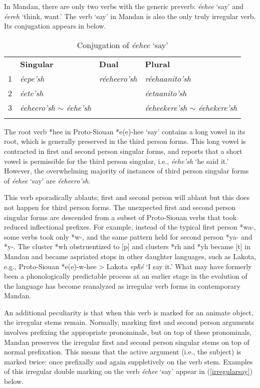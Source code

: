 In Mandan, there are only two verbs with the generic preverb: \textit{éehee} `say' and \textit{éereh} `think, want.' The verb `say' in Mandan is also the only truly irregular verb. Its conjugation appears in  below.

\begin{table}
\caption{Conjugation of \textit{éehee} `say'} \label{mandantosay}

    \begin{tabular}{llll}\hline\hline
~&
	\textbf{Singular}&
	\textbf{Dual}&
	\textbf{Plural}\\
1&
	\textit{éepe'sh}&
	\textit{réeheero'sh}&
	\textit{réehaanito'sh}\\
2&
	\textit{éete'sh}&
	~&
	\textit{éetaanito'sh}\\
3&
	\textit{éeheero'sh} $\sim$ \textit{éehe'sh}&
	~&
	\textit{éeheekere'sh} $\sim$ \textit{éehekere'sh}\\
\lspbottomrule
    \end{tabular}
\end{table}

The root verb *hee in Proto-Siouan *e(e)-hee `say' contains a long vowel in its root, which is generally preserved in the third person forms. This long vowel is contracted in first and second person singular forms, and \citet{hollow1970} reports that a short vowel is permissible for the third person singular, i.e., \textit{éehe'sh} `he said it.' However, the overwhelming majority of instances of third person singular forms of \textit{éehee} `say' are \textit{éeheero'sh}.

This verb sporadically ablauts; first and second person will ablaut but this does not happen for third person forms. The unexpected first and second person singular forms are descended from a subset of Proto-Siouan verbs that took reduced inflectional prefixes. For example, instead of the typical first person *wa-, some verbs took only *w-, and the same pattern held for second person *ya- and *y-. The cluster *wh obstruentized to [p] and clusters *rh and *yh became [t] in Mandan and became aspriated stops in other daughter languages, such as Lakota, e.g., Proto-Siouan *e(e)-w-hee > Lakota \textit{epȟé} `I say it.' What may have formerly been a phonologically predictable process at an earlier stage in the evolution of the language has become reanalyzed as irregular verb forms in contemporary Mandan.

An additional peculiarity is that when this verb is marked for an animate object, the irregular stems remain. Normally, marking first and second person arguments involves prefixing the appropriate pronominals, but on top of these pronominals, Mandan preserves the irregular first and second person singular stems on top of normal prefixation. This means that the active argument (i.e., the subject) is marked twice: once prefixally and again suppletively on the verb stem. Examples of this irregular double marking on the verb \textit{éehee} `say' appear in (\ref{irregularsay}) below.

